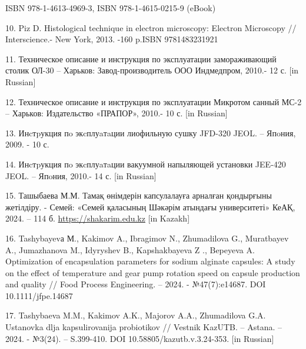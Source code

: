 \begin{references}
ISBN 978-1-4613-4969-3, ISBN 978-1-4615-0215-9 (eBook)

10. Piz D. Histological technique in electron microscopy: Electron
Microscopy // Interscience.- New York, 2013. -160 p.ISBN 9781483231921

11. Техническое описание и инструкция по эксплуатации замораживающий
столик ОЛ-30 -- Харьков: Завод-производитель ООО Индмедпром, 2010.- 12
с. {[}in Russian{]}

12. Техническое описание и инструкция по эксплуатации Микротом санный
МС-2 -- Харьков: Издательство «ПРАПОР», 2010.- 10 с. {[}in Russian{]}

13. Инcтpукция пo экcплуaтaции лиофильную сушку JFD-320 JEOL. -- Япoния,
2009. - 10 с.

14. Инcтpукция пo экcплуaтaции вакуумной напыляющей установки JEE-420
JEOL. -- Япoния, 2010.- 14 с. {[}in Russian{]}

15. Ташыбаева М.М. Тамақ өнімдерін капсулалауға арналған қондырғыны
жетілдіру. - Семей: «Семей қаласының Шәкәрім атындағы университеті»
КеАҚ, 2024. -- 114 б.
\href{https://shakarim.edu.kz/upload/editor/pages/science/dissertation/Tashybaeva/kaz-1.pdf}{https://shakarim.edu.kz}
{[}in Kazakh{]}

16. Tashybayevа М., Kakimov A., Ibragimov N., Zhumadilova G., Muratbayev
A., Jumazhanova M., Idyryshev B., Kapshakbayeva Z ., Bepeyeva A.
Optimization of encapsulation parameters for sodium alginate capsules: A
study on the effect of temperature and gear pump rotation speed on
capsule production and quality // Food Process Engineering. -- 2024. -
№47(7):e14687. DOI 10.1111/jfpe.14687

17. Tashybaeva M.M., Kakimov A.K., Majorov A.A., Zhumadilova G.A.
Ustanovka dlja kapsulirovanija probiotikov // Vestnik KazUTB. -- Astana.
-- 2024. - №3(24). -- S.399-410. DOI 10.58805/kazutb.v.3.24-353. {[}in
Russian{]}
\end{references}

